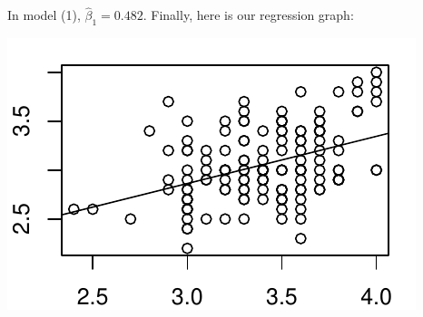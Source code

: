 \documentclass[fontsize=12pt,DIV=30]{scrartcl}\usepackage[]{graphicx}\usepackage[]{color}
\makeatletter
\def\maxwidth{ %
  \ifdim\Gin@nat@width>\linewidth
    \linewidth
  \else
    \Gin@nat@width
  \fi
}
\newenvironment{knitrout}{}{} %
\makeatother
\begin{document}
In model (1), $\hat\beta_1=0.482$. 
Finally, here is our regression graph:

\centering
\begin{knitrout}
\color{fgcolor}
\includegraphics[width=\maxwidth]{figure/regfig-1} 

\end{knitrout}
\end{document}
